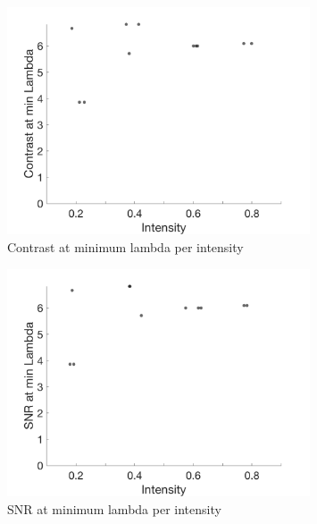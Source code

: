 \documentclass[12pt]{article}
\begin{document}
\begin{figure}[H]
	\centering
	\includegraphics[width=0.8\textwidth]{Figures/Contrasts.png}
	\caption{Contrast at minimum lambda per intensity}
	\label{Fig:Contrast}
\end{figure}


\begin{figure}[H]
	\centering
	\includegraphics[width=0.8\textwidth]{Figures/SNRs.png}
	\caption{SNR at minimum lambda per intensity}
	\label{Fig:SNR}
\end{figure}
\end{document}
